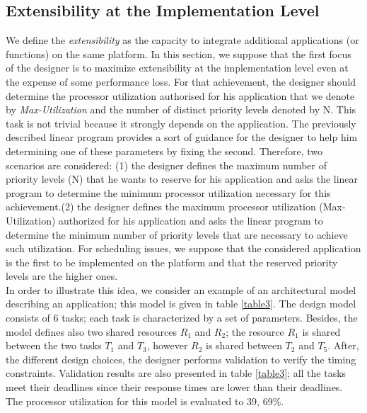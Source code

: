 \documentclass[runningheads,a4paper]{llncs}
\begin{document}
\subsection*{Extensibility at the Implementation Level}
We define the \emph{extensibility} as the capacity to integrate additional applications (or functions) on the same platform. In this section, we suppose that the first focus of the designer is to maximize extensibility at the implementation level even at the expense of some performance loss. For that achievement, the designer should determine the processor utilization authorised for his application that we denote by \emph{Max-Utilization }and the number of distinct priority levels denoted by N. This task is not trivial because it strongly depends on the application. The  previously described linear program provides a sort of guidance for the designer to help him determining one of these parameters by fixing the second. Therefore, two scenarios are considered: (1) the designer defines the maximum number of priority levels (N) that he wants to reserve for his application and asks the linear program to determine the minimum processor utilization necessary for this achievement.(2) the designer defines the maximum processor utilization (Max-Utilization) authorized for his application and asks the linear program to determine the minimum number of priority levels that are necessary to achieve such utilization.    
For scheduling issues, we suppose that the considered application is the first to be implemented on the platform and that the reserved priority levels are the higher ones.
\\In order to illustrate this idea, we consider an example of an architectural model describing an application; this model is given in table \ref{table3}. The design model consists of 6 tasks; each task is characterized by a set of parameters. Besides, the model defines also two shared resources $R_1$ and $R_2$; the resource $R_1$ is shared between the two tasks $T_1$ and $T_3$, however $R_2$ is shared between $T_2$ and $T_5$. After, the different design choices, the designer performs validation to verify the timing constraints. Validation results are also presented in table \ref{table3}; all the tasks meet their deadlines since their response times are  lower than their deadlines. The processor utilization for this model is evaluated to 39, 69\%. 
\end{document}

